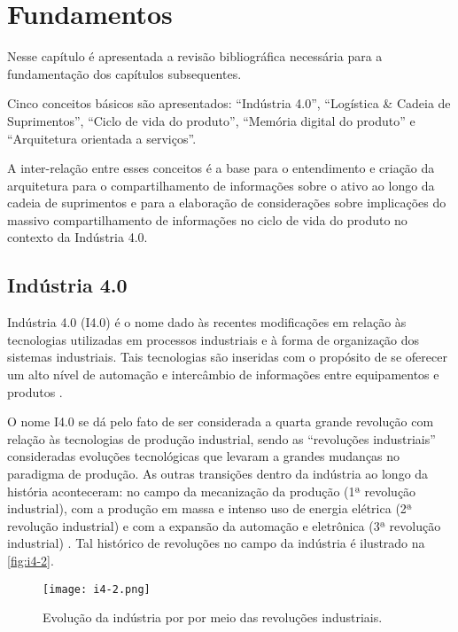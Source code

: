 \chapter{Fundamentos}
\label{cha:fundamentos}
	
	Nesse capítulo é apresentada a revisão bibliográfica necessária para a fundamentação dos capítulos subsequentes.
	
	Cinco conceitos básicos são apresentados: ``Indústria 4.0'', ``Logística \& Cadeia de Suprimentos'', ``Ciclo de vida do produto'', ``Memória digital do produto'' e ``Arquitetura orientada a serviços''.
	
	A inter-relação entre esses conceitos é a base para o entendimento e criação da arquitetura para o compartilhamento de informações sobre o ativo ao longo da cadeia de suprimentos e para a elaboração de considerações sobre implicações do massivo compartilhamento de informações no ciclo de vida do produto no contexto da Indústria 4.0.

\section{Indústria 4.0}

	Indústria 4.0 (I4.0) é o nome dado às recentes modificações em relação às tecnologias utilizadas em processos industriais e à forma de organização dos sistemas industriais. Tais tecnologias são inseridas com o propósito de se oferecer um alto nível de automação e intercâmbio de informações entre equipamentos e produtos \cite{lasi2014industryfour}.

	O nome I4.0 se dá pelo fato de ser considerada a quarta grande revolução com relação às tecnologias de produção industrial, sendo as ``revoluções industriais'' consideradas evoluções tecnológicas que levaram a grandes mudanças no paradigma de produção. As outras transições dentro da indústria ao longo da história aconteceram: no campo da mecanização da produção (1ª revolução industrial), com a produção em massa e intenso uso de energia elétrica (2ª revolução industrial) e com a expansão da automação e eletrônica (3ª revolução industrial) \cite{lasi2014industryfour}. Tal histórico de revoluções no campo da indústria é ilustrado na \autoref{fig:i4-2}.

	\begin{figure}[htb]
		\centering
		\caption{Evolução da indústria por por meio das revoluções industriais.}
		\label{fig:i4-2}
		\texttt{[image: i4-2.png]}
	\end{figure}

